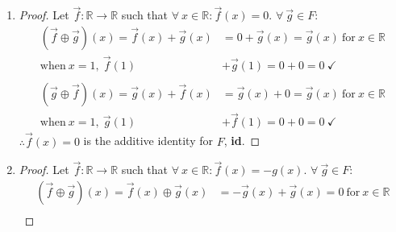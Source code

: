 \documentclass{article}
\newcommand{\bld}{\textbf}
\newcommand{\bb}{\mathbb}
\newcommand{\bitem}[1]{\item[\bld{#1.}]}
\begin{document}
\begin{enumerate}
\begin{proof}
\begin{align*}
      LHS = (\vec{f} \oplus (\vec{g} \oplus \vec{h}))(x)   & = \vec{f}(x) + (\vec{g} \oplus \vec{h})(x)     \\
                                                           & = \vec{f}(x) + (\vec{g}(x) + \vec{h}(x))       \\
      \text{when}~x=1,~\vec{f}(1) + (\vec{g}(1) + \vec{h}) & = 0 + (0 + 0) = 0~\checkmark                   \\ \\
      RHS = ((\vec{f} \oplus \vec{g}) \oplus \vec{h})(x)   & = (\vec{f} \oplus \vec{g})(x) + \vec{h}(x)     \\
                                                           & = (\vec{f}(x) + \vec{g}(x)) + \vec{h}(x) = LHS \\
      \text{when}~x=1,~(\vec{f}(1) + \vec{g}(1)) + \vec{h} & = (0 + 0) + 0 = 0~\checkmark
    \end{align*}
    $\therefore \forall~\vec{f},\vec{g},\vec{h} \in F: (\vec{f} \oplus (\vec{g} \oplus \vec{h}))(x) = ((\vec{f} \oplus \vec{g}) \oplus \vec{h})(x)$
  \end{proof}
  \bitem{Axiom 4}
  \begin{proof}
    Let $\vec{f}: \bb{R} \rightarrow \bb{R}$ such that $\forall~x \in \bb{R}: \vec{f}(x) = 0$. $\forall~\vec{g} \in F$:
    \begin{align*}
      (\vec{f} \oplus \vec{g})(x) = \vec{f}(x) + \vec{g}(x) & = 0 + \vec{g}(x)= \vec{g}(x)~\text{for}~x \in \bb{R} \\
      \text{when}~x=1,~\vec{f}(1)                           & + \vec{g}(1) = 0 + 0 = 0~\checkmark                  \\ \\
      (\vec{g} \oplus \vec{f})(x) = \vec{g}(x) + \vec{f}(x) & = \vec{g}(x) + 0= \vec{g}(x)~\text{for}~x \in \bb{R} \\
      \text{when}~x=1,~\vec{g}(1)                           & + \vec{f}(1) = 0 + 0 = 0~\checkmark
    \end{align*}
    $\therefore \vec{f}(x) = 0$ is the additive identity for $F$, \bld{id}.
  \end{proof}
  \bitem{Axiom 5}
  \begin{proof}
    Let $\vec{f}: \bb{R} \rightarrow \bb{R}$ such that $\forall~x \in \bb{R}: \vec{f}(x) = -g(x)$. $\forall~\vec{g} \in F$:
    \begin{align*}
      (\vec{f} \oplus \vec{g})(x) = \vec{f}(x) \oplus \vec{g}(x) & = -\vec{g}(x) + \vec{g}(x)= 0~\text{for}~x \in \bb{R} \\

\end{align*}
\end{proof}
\end{enumerate}
\end{document}
